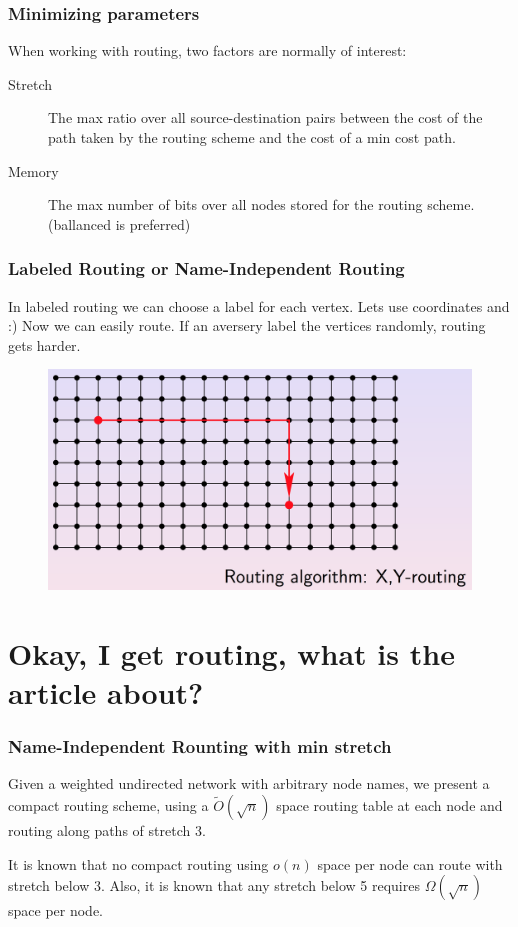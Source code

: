 \documentclass[10pt, compress]{beamer}
\begin{document}
\begin{frame}[fragile]
  \frametitle{Minimizing parameters}
  When working with routing, two factors are normally of interest:
  \begin{description}
    \item[Stretch] The max ratio over all source-destination pairs between the
        cost of the path taken by the routing scheme and the cost of a min
        cost path.
    \item[Memory] The max number of bits over all nodes stored for the routing
        scheme. (ballanced is preferred)
  \end{description}
\end{frame}

\begin{frame}[fragile]
  \frametitle{Labeled Routing or Name-Independent Routing}

  In labeled routing we can choose a label for each vertex.
  Lets use coordinates and :) Now we can easily route. If an aversery
  label the vertices randomly, routing gets harder.

  \begin{figure}
    \includegraphics[scale=0.3]{images/xyrouting.png} 
  \end{figure}
\end{frame}

\section{Okay, I get routing, what is the article about?}

\begin{frame}[fragile]
  \frametitle{Name-Independent Rounting with min stretch}
    Given a weighted undirected network with arbitrary node names, we present
    a compact routing scheme, using a $\tilde{O}(\sqrt{n})$ space routing
    table at each node and routing along paths of stretch 3.

    It is known that no compact routing using $o(n)$ space per node can route
    with stretch below 3. Also, it is known that any stretch below 5 requires
    $\Omega(\sqrt{n})$ space per node.
\end{frame}
\end{document}
